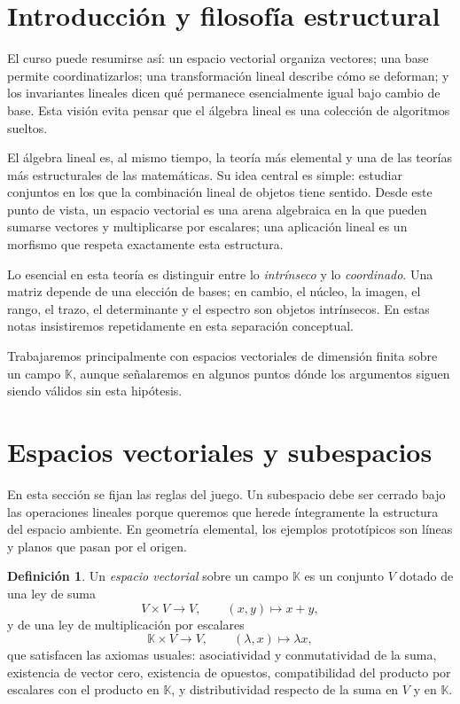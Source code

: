 \documentclass[10pt,a4paper,oneside]{article}
\theoremstyle{plain}
\theoremstyle{definition}
\newtheorem{definition}[theorem]{Definición}
\theoremstyle{remark}
\newcommand{\K}{\mathbb{K}}
\begin{document}
\section{Introducción y filosofía estructural}
\begin{ideaBox}
El curso puede resumirse así: un espacio vectorial organiza vectores; una base permite coordinatizarlos; una transformación lineal describe cómo se deforman; y los invariantes lineales dicen qué permanece esencialmente igual bajo cambio de base. Esta visión evita pensar que el álgebra lineal es una colección de algoritmos sueltos.
\end{ideaBox}
El álgebra lineal es, al mismo tiempo, la teoría más elemental y una de las teorías más estructurales de las matemáticas. Su idea central es simple: estudiar conjuntos en los que la combinación lineal de objetos tiene sentido. Desde este punto de vista, un espacio vectorial es una arena algebraica en la que pueden sumarse vectores y multiplicarse por escalares; una aplicación lineal es un morfismo que respeta exactamente esta estructura.

Lo esencial en esta teoría es distinguir entre lo \emph{intrínseco} y lo \emph{coordinado}. Una matriz depende de una elección de bases; en cambio, el núcleo, la imagen, el rango, el trazo, el determinante y el espectro son objetos intrínsecos. En estas notas insistiremos repetidamente en esta separación conceptual.

Trabajaremos principalmente con espacios vectoriales de dimensión finita sobre un campo \(\K\), aunque señalaremos en algunos puntos dónde los argumentos siguen siendo válidos sin esta hipótesis.

\section{Espacios vectoriales y subespacios}
\begin{summaryBox}
En esta sección se fijan las reglas del juego. Un subespacio debe ser cerrado bajo las operaciones lineales porque queremos que herede íntegramente la estructura del espacio ambiente. En geometría elemental, los ejemplos prototípicos son líneas y planos que pasan por el origen.
\end{summaryBox}
\begin{definition}
Un \emph{espacio vectorial} sobre un campo \(\K\) es un conjunto \(V\) dotado de una ley de suma
\[
V\times V\to V,\qquad (x,y)\mapsto x+y,
\]
y de una ley de multiplicación por escalares
\[
\K\times V\to V,\qquad (\lambda,x)\mapsto \lambda x,
\]
que satisfacen las axiomas usuales: asociatividad y conmutatividad de la suma, existencia de vector cero, existencia de opuestos, compatibilidad del producto por escalares con el producto en \(\K\), y distributividad respecto de la suma en \(V\) y en \(\K\).
\end{definition}
\end{document}
